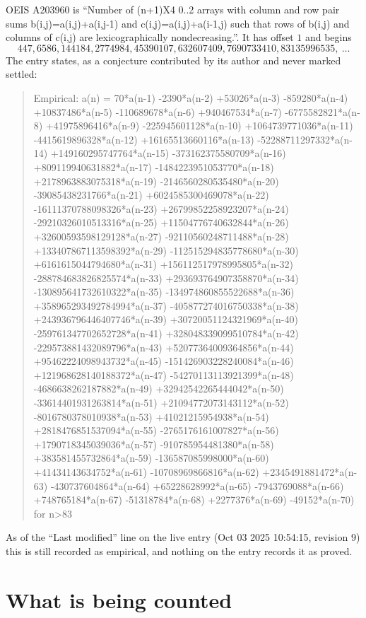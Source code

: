 \documentclass[11pt,a4paper]{article}
\theoremstyle{plain}
\theoremstyle{definition}
\begin{document}
OEIS A203960 is ``Number of (n+1)X4 0..2 arrays with column and row pair sums b(i,j)=a(i,j)+a(i,j-1) and c(i,j)=a(i,j)+a(i-1,j) such that rows of b(i,j) and columns of c(i,j) are lexicographically nondecreasing.''. It has offset $1$ and begins
\[
447, 6586, 144184, 2774984, 45390107, 632607409, 7690733410, 83135996535,\ \dots
\]
The entry states, as a conjecture contributed by its author and never marked settled:
\begin{quote}
Empirical: a(n) = 70*a(n-1) -2390*a(n-2) +53026*a(n-3) -859280*a(n-4) +10837486*a(n-5) -110689678*a(n-6) +940467534*a(n-7) -6775582821*a(n-8) +41975896416*a(n-9) -225945601128*a(n-10) +1064739771036*a(n-11) -4415619896328*a(n-12) +16165513660116*a(n-13) -52288711297332*a(n-14) +149160295747764*a(n-15) -373162375580709*a(n-16) +809119940631882*a(n-17) -1484223951053770*a(n-18) +2178963883075318*a(n-19) -2146560280535480*a(n-20) -39085438231766*a(n-21) +6024585300469078*a(n-22) -16111370788098326*a(n-23) +26799852258923207*a(n-24) -29210326010513316*a(n-25) +11504776740632844*a(n-26) +32600593598129128*a(n-27) -92110560248711488*a(n-28) +133407867113598392*a(n-29) -112515294835778680*a(n-30) +6161615044794680*a(n-31) +156112517978995805*a(n-32) -288784683826825574*a(n-33) +293693764907358870*a(n-34) -130895641732610322*a(n-35) -134974860855522688*a(n-36) +358965293492784994*a(n-37) -405877274016750338*a(n-38) +243936796446407746*a(n-39) +30720051124321969*a(n-40) -259761347702652728*a(n-41) +328048339099510784*a(n-42) -229573881432089796*a(n-43) +52077364009364856*a(n-44) +95462224098943732*a(n-45) -151426903228240084*a(n-46) +121968628140188372*a(n-47) -54270113113921399*a(n-48) -4686638262187882*a(n-49) +32942542265444042*a(n-50) -33614401931263814*a(n-51) +21094772073143112*a(n-52) -8016780378010938*a(n-53) +41021215954938*a(n-54) +2818476851537094*a(n-55) -2765176161007827*a(n-56) +1790718345039036*a(n-57) -910785954481380*a(n-58) +383581455732864*a(n-59) -136587085998000*a(n-60) +41434143634752*a(n-61) -10708969866816*a(n-62) +2345491881472*a(n-63) -430737604864*a(n-64) +65228628992*a(n-65) -7943769088*a(n-66) +748765184*a(n-67) -51318784*a(n-68) +2277376*a(n-69) -49152*a(n-70) for n>83
\end{quote}
As of the ``Last modified'' line on the live entry (Oct 03 2025 10:54:15, revision 9) this is still
recorded as empirical, and nothing on the entry records it as proved.

\section{What is being counted}
\end{document}
